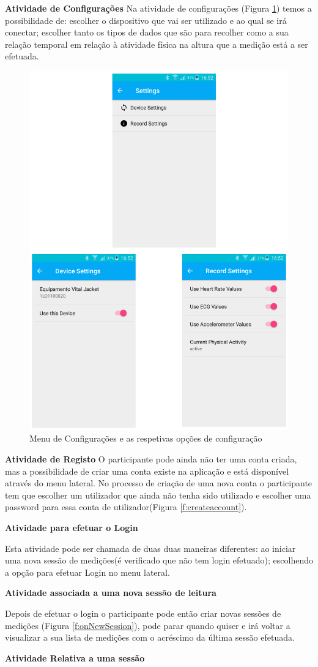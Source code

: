 \textbf{Atividade de Configurações}
Na atividade de configurações (Figura \ref{f:settings}) temos a possibilidade de: escolher o dispositivo que vai ser utilizado e ao qual se irá conectar; escolher tanto os tipos de dados que são para recolher como a sua relação temporal em relação à atividade física na altura que a medição está a ser efetuada.
\begin{figure}[H]
\centering
\includegraphics[height=0.7\textwidth]{imgs/settings.png}
\caption[Menu de Configurações e as respetivas opções de configuração]{Menu de Configurações e as respetivas opções de configuração}
\label{f:settings}
\end{figure}
\par
\textbf{Atividade de Registo}
O participante pode ainda não ter uma conta criada, mas a possibilidade de criar uma conta existe na aplicação e está disponível através do menu lateral. No processo de criação de uma nova conta o participante tem que escolher um utilizador que ainda não tenha sido utilizado e escolher uma password para essa conta de utilizador(Figura \ref{f:createaccount}). 
\par
\textbf{Atividade para efetuar o Login}
\par
Esta atividade pode ser chamada de duas duas maneiras diferentes: ao iniciar uma nova sessão de medições(é verificado que não tem login efetuado); escolhendo a opção para efetuar Login no menu lateral.
\par
\textbf{Atividade associada a uma nova sessão de leitura}
\par
Depois de efetuar o login o participante pode então criar novas sessões de medições (Figura \ref{f:onNewSession}), pode parar quando quiser e irá voltar a visualizar a sua lista de medições com o acréscimo da última sessão efetuada. 
\par
\textbf{Atividade Relativa a uma sessão}
\par

